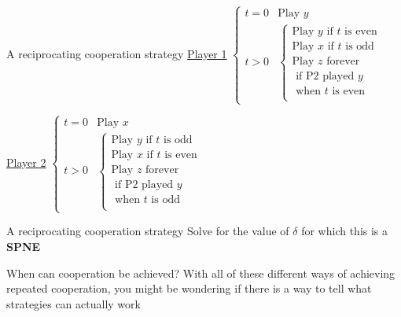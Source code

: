 \begin{frame}{A reciprocating cooperation strategy}
    \underline{Player 1}
    $
      \begin{cases}
        t=0 & \text{Play } y \\ 
        t>0 & 
        \begin{cases}
          \text{Play } y \text{ if } t \text { is even } \\ 
          \text{Play } x \text{ if } t \text { is odd } \\ 
          \text{Play } z \text{ forever } \\
          \text{ if P2 played } y \\ 
          \text{ when $t$ is even} \\ 
        \end{cases}
      \end{cases} 
    $

    \underline{Player 2}
    $
      \begin{cases}
        t=0 & \text{Play } x \\ 
        t>0 & 
        \begin{cases}
          \text{Play } y \text{ if } t \text { is odd } \\ 
          \text{Play } x \text{ if } t \text { is even } \\ 
          \text{Play } z \text{ forever } \\
          \text{ if P2 played } y \\ 
          \text{ when $t$ is odd} \\ 
        \end{cases}
      \end{cases} 
      $
\end{frame}

\begin{frame}{A reciprocating cooperation strategy}
  Solve for the value of $\delta$ for which this is a \textbf{SPNE}
  \vspace{50mm}
\end{frame}

\begin{frame}{When can cooperation be achieved?}
  With all of these different ways of achieving repeated cooperation, 
  you might be wondering if there is a way to tell what strategies can actually work
\end{frame}

